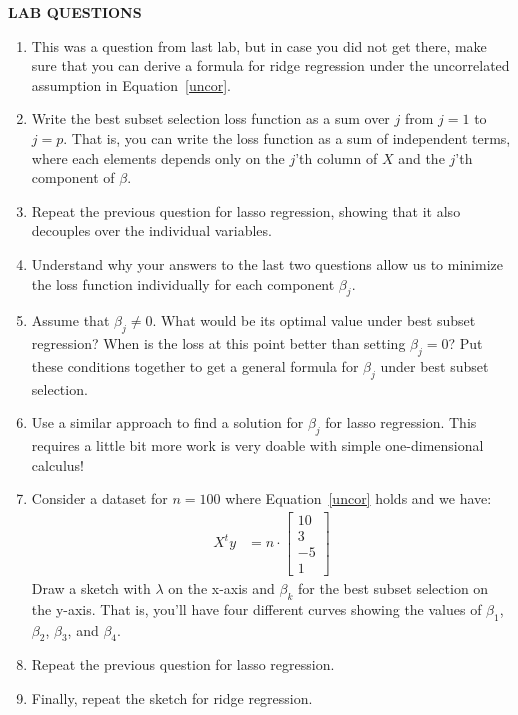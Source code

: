\documentclass[12pt,hidelinks]{article}
\numberwithin{equation}{section}
\begin{document}
\newpage

\textbf{LAB QUESTIONS}

\vspace*{0pt}

\begin{enumerate}
\item This was a question from last lab, but in case you did not get there,
make sure that you can derive a formula for ridge regression under the uncorrelated
assumption in Equation~\ref{uncor}.
\item Write the best subset selection loss function as a sum over $j$ from $j=1$
to $j=p$. That is, you can write the loss function as a sum of independent terms,
where each elements depends only on the $j$'th column of $X$ and the $j$'th component
of $\beta$.
\item Repeat the previous question for lasso regression, showing that it also
decouples over the individual variables.
\item Understand why your answers to the last two questions allow us to minimize
the loss function individually for each component $\beta_j$.
\item Assume that $\beta_j \neq 0$. What would be its optimal value under best
subset regression? When is the loss at this point better than setting $\beta_j = 0$?
Put these conditions together to get a general formula for $\beta_j$ under best
subset selection.
\item Use a similar approach to find a solution for $\beta_j$ for lasso regression.
This requires a little bit more work is very doable with simple one-dimensional
calculus!
\item Consider a dataset for $n=100$ where Equation~\ref{uncor} holds and we have:
\begin{align}
X^t y &= n \cdot \begin{bmatrix} 10 \\ 3 \\ -5 \\ 1 \end{bmatrix}
\end{align}
Draw a sketch with $\lambda$ on the x-axis and $\beta_k$ for the best subset selection
on the y-axis. That is, you'll have four different curves showing the values of $\beta_1$,
$\beta_2$, $\beta_3$, and $\beta_4$.
\item Repeat the previous question for lasso regression.
\item Finally, repeat the sketch for ridge regression.
\end{enumerate}
\end{document}
